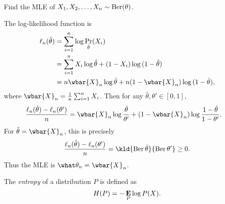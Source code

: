\begin{exercise}
    Find the MLE of $X_1, X_2, \dots, X_n \sim \operatorname{Ber}(\theta)$.
\end{exercise}
\begin{solution}
    The log-likelihood function is \begin{align*}
        \ell_n(\hat\theta)
            &= \sum_{i=1}^{n} \log \Pr_{\hat\theta}(X_i) \\
            &= \sum_{i=1}^{n} X_i \log \hat\theta
                + (1 - X_i) \log{}(1 - \hat\theta) \\
            &= n \wbar{X}_n \log \hat\theta
                + n (1 - \wbar{X}_n) \log{}(1 - \hat\theta),
    \end{align*} where $\wbar{X}_n = \frac{1}{n} \sum_{i=1}^{n} X_i$.
    Then for any $\hat\theta, \theta' \in [0, 1]$, \begin{align*}
        \frac{\ell_n(\hat\theta) - \ell_n(\theta')}n
            &= \wbar{X}_n \log \frac{\hat\theta}{\theta'}
                + (1 - \wbar{X}_n) \log \frac{1 - \hat\theta}{1 - \theta'}.
    \end{align*}
    For $\hat\theta = \wbar{X}_n$, this is precisely \[
        \frac{\ell_n(\hat\theta) - \ell_n(\theta')}n
            = \kld{\Ber \hat\theta}{\Ber \theta'}
            \ge 0.
    \] Thus the MLE is $\what\theta_n = \wbar{X}_n$.
\end{solution}

\begin{definition*}[Entropy] \label{def:entropy}
    The \emph{entropy} of a distribution $P$ is defined as \[
        H(P) = -\operatorname*{\textbf{E}}_P \log P(X).
    \]
\end{definition*}


